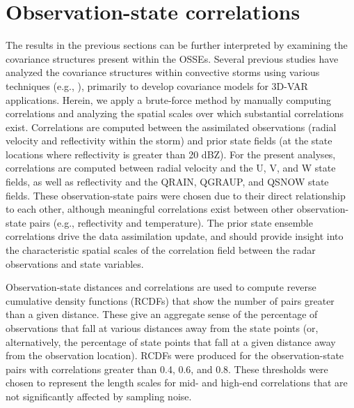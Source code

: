 \section{Observation-state correlations}
The results in the previous sections can be further interpreted by examining the covariance structures present within the OSSEs. Several previous studies have analyzed the covariance structures within convective storms using various techniques (e.g., \citealt{micheletal11}), primarily to develop covariance models for 3D-VAR applications. Herein, we apply a brute-force method by manually computing correlations and analyzing the spatial scales over which substantial correlations exist. Correlations are computed between the assimilated observations (radial velocity and reflectivity within the storm) and prior state fields (at the state locations where reflectivity is greater than 20 dBZ). For the present analyses, correlations are computed between radial velocity and the U, V, and W state fields, as well as reflectivity and the QRAIN, QGRAUP, and QSNOW state fields. These observation-state pairs were chosen due to their direct relationship to each other, although meaningful correlations exist between other observation-state pairs (e.g., reflectivity and temperature). The prior state ensemble correlations drive the data assimilation update, and should provide insight into the characteristic spatial scales of the correlation field between the radar observations and state variables.

Observation-state distances and correlations are used to compute reverse cumulative density functions (RCDFs) that show the number of pairs greater than a given distance. These give an aggregate sense of the percentage of observations that fall at various distances away from the state points (or, alternatively, the percentage of state points that fall at a given distance away from the observation location). RCDFs were produced for the observation-state pairs with correlations greater than 0.4, 0.6, and 0.8. These thresholds were chosen to represent the length scales for mid- and high-end correlations that are not significantly affected by sampling noise.


